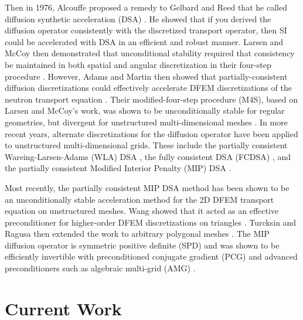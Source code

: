 \documentclass[11pt]{article}
\begin{document}
Then in 1976, Alcouffe proposed a remedy to Gelbard and Reed that he called diffusion synthetic acceleration (DSA) \cite{alcouffe1976stable,alcouffe1977DSA,alcouffe1977diffusion}. He showed that if you derived the diffusion operator consistently with the discretized transport operator, then SI could be accelerated with DSA in an efficient and robust manner. Larsen and McCoy then demonstrated that unconditional stability required that consistency be maintained in both spatial and angular discretization in their four-step procedure \cite{larsen1982unconditionally_I,larsen1982unconditionally_II}. However, Adams and Martin then showed that partially-consistent diffusion discretizations could effectively accelerate DFEM discretizations of the neutron transport equation \cite{ref::dsa_DFEM_adams_martin}. Their modified-four-step procedure (M4S), based on Larsen and McCoy's work, was shown to be unconditionally stable for regular geometries, but divergent for unstructured multi-dimensional meshes \cite{warsa2002fully}. In more recent years, alternate discretizations for the diffusion operator have been applied to unstructured multi-dimensional grids. These include the partially consistent Wareing-Larsen-Adams (WLA) DSA \cite{ref::WLA_DSA}, the fully consistent DSA (FCDSA) \cite{warsa2002fully}, and the partially consistent Modified Interior Penalty (MIP) DSA \cite{ref::DSA_wang_ragusa,wang2009adaptive,turcksin2014discontinuous}.

Most recently, the partially consistent MIP DSA method has been shown to be an unconditionally stable acceleration method for the 2D DFEM transport equation on unstructured meshes. Wang showed that it acted as an effective preconditioner for higher-order DFEM discretizations on triangles \cite{ref::DSA_wang_ragusa,wang2009adaptive}. Turcksin and Ragusa then extended the work to arbitrary polygonal meshes \cite{turcksin2014discontinuous}. The MIP diffusion operator is symmetric positive definite (SPD) and was shown to be efficiently invertible with preconditioned conjugate gradient (PCG) and advanced preconditioners such as algebraic multi-grid (AMG) \cite{turcksin2014discontinuous}.

\section{Current Work}
\label{sec::CW}
\end{document}
